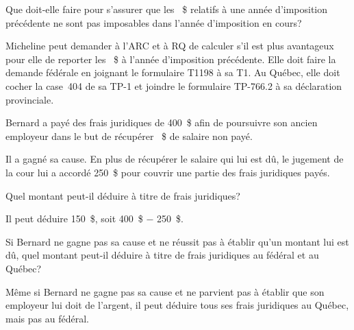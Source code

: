 \begin{sousQuestion}
	Que doit-elle faire pour s'assurer que les ~\$ relatifs à une année d'imposition précédente ne sont pas imposables dans l'année d'imposition en cours?
\end{sousQuestion}
Micheline peut demander à l'ARC et à RQ de calculer s'il est plus avantageux pour elle de reporter les ~\$ à l'année d'imposition précédente. Elle doit faire la demande fédérale en joignant le formulaire T1198 à sa T1. Au Québec, elle doit cocher la case~404 de sa TP-1 et joindre le formulaire TP-766.2 à sa déclaration provinciale.

\begin{question}
	Bernard a payé des frais juridiques de 400~\$ afin de poursuivre son ancien employeur dans le but de récupérer ~\$ de salaire non payé.
\end{question}
\setcounter{sousQuestion}{0}
\begin{sousQuestion}
	Il a gagné sa cause. En plus de récupérer le salaire qui lui est dû, le jugement de la cour lui a accordé 250~\$ pour couvrir une partie des frais juridiques payés.
	
	Quel montant peut-il déduire à titre de frais juridiques?
\end{sousQuestion}
Il peut déduire 150~\$, soit 400~\$ $-$ 250~\$.

\begin{sousQuestion}
	Si Bernard ne gagne pas sa cause et ne réussit pas à établir qu'un montant lui est dû, quel montant peut-il déduire à titre de frais juridiques au fédéral et au Québec?
\end{sousQuestion}
Même si Bernard ne gagne pas sa cause et ne parvient pas à établir que son employeur lui doit de l'argent, il peut déduire tous ses frais juridiques au Québec, mais pas au fédéral.

